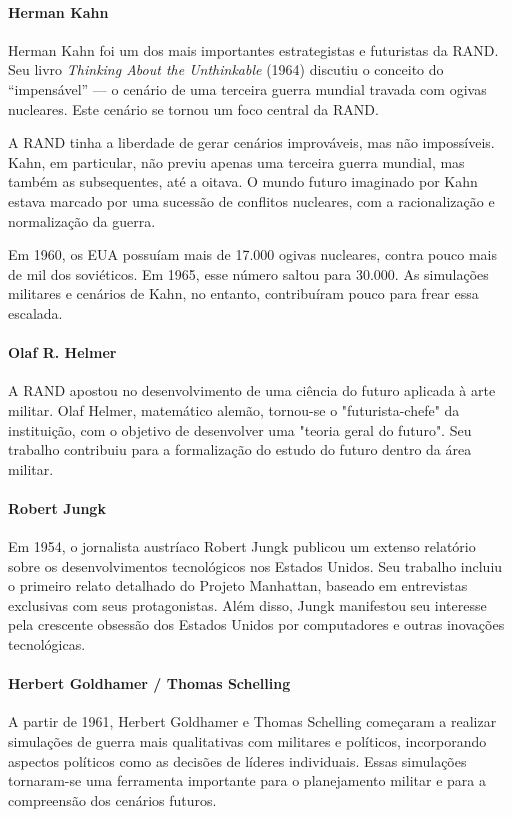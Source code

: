 \paragraph{Herman Kahn}
Herman Kahn foi um dos mais importantes estrategistas e futuristas da RAND. Seu livro \textit{Thinking About the Unthinkable} (1964) discutiu o conceito do “impensável” — o cenário de uma terceira guerra mundial travada com ogivas nucleares. Este cenário se tornou um foco central da RAND. 

A RAND tinha a liberdade de gerar cenários improváveis, mas não impossíveis. Kahn, em particular, não previu apenas uma terceira guerra mundial, mas também as subsequentes, até a oitava. O mundo futuro imaginado por Kahn estava marcado por uma sucessão de conflitos nucleares, com a racionalização e normalização da guerra. 

Em 1960, os EUA possuíam mais de 17.000 ogivas nucleares, contra pouco mais de mil dos soviéticos. Em 1965, esse número saltou para 30.000. As simulações militares e cenários de Kahn, no entanto, contribuíram pouco para frear essa escalada.

\paragraph{Olaf R. Helmer}
A RAND apostou no desenvolvimento de uma ciência do futuro aplicada à arte militar. Olaf Helmer, matemático alemão, tornou-se o "futurista-chefe" da instituição, com o objetivo de desenvolver uma "teoria geral do futuro". Seu trabalho contribuiu para a formalização do estudo do futuro dentro da área militar.

\paragraph{Robert Jungk}
Em 1954, o jornalista austríaco Robert Jungk publicou um extenso relatório sobre os desenvolvimentos tecnológicos nos Estados Unidos. Seu trabalho incluiu o primeiro relato detalhado do Projeto Manhattan, baseado em entrevistas exclusivas com seus protagonistas. Além disso, Jungk manifestou seu interesse pela crescente obsessão dos Estados Unidos por computadores e outras inovações tecnológicas.

\paragraph{Herbert Goldhamer / Thomas Schelling}
A partir de 1961, Herbert Goldhamer e Thomas Schelling começaram a realizar simulações de guerra mais qualitativas com militares e políticos, incorporando aspectos políticos como as decisões de líderes individuais. Essas simulações tornaram-se uma ferramenta importante para o planejamento militar e para a compreensão dos cenários futuros.

